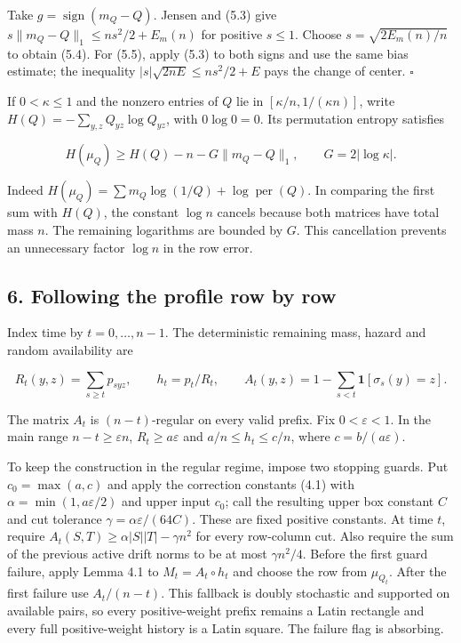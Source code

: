 \documentclass[english,11pt,a4paper]{article}
\begin{document}
Take \(g=\operatorname{sign}(m_Q-Q)\). Jensen and (5.3) give \(s\|m_Q-Q\|_1\le ns^2/2+E_m(n)\) for positive \(s\le1\). Choose \(s=\sqrt{2E_m(n)/n}\) to obtain (5.4). For (5.5), apply (5.3) to both signs and use the same bias estimate; the inequality \(|s|\sqrt{2nE}\le ns^2/2+E\) pays the change of center. \(\square\)

If \(0<\kappa\le1\) and the nonzero entries of \(Q\) lie in \([\kappa/n,1/(\kappa n)]\), write \(H(Q)=-\sum_{y,z}Q_{yz}\log Q_{yz}\), with \(0\log0=0\). Its permutation entropy satisfies

\nopagebreak[4]
\[H(\mu_Q)\ge H(Q)-n-G\|m_Q-Q\|_1,\qquad G=2|\log\kappa|.\tag{5.6}\]

Indeed \(H(\mu_Q)=\sum m_Q\log(1/Q)+\log\operatorname{per}(Q)\). In comparing the first sum with \(H(Q)\), the constant \(\log n\) cancels because both matrices have total mass \(n\). The remaining logarithms are bounded by \(G\). This cancellation prevents an unnecessary factor \(\log n\) in the row error.

\subsection{6. Following the profile row by row}\label{following-the-profile-row-by-row}

Index time by \(t=0,\ldots,n-1\). The deterministic remaining mass, hazard and random availability are

\nopagebreak[4]
\[R_t(y,z)=\sum_{s\ge t}p_{syz},\qquad h_t=p_t/R_t,\qquad
A_t(y,z)=1-\sum_{s<t}\mathbf1[\sigma_s(y)=z].\tag{6.1}\]

The matrix \(A_t\) is \((n-t)\)-regular on every valid prefix. Fix \(0<\varepsilon<1\). In the main range \(n-t\ge\varepsilon n\), \(R_t\ge a\varepsilon\) and \(a/n\le h_t\le c/n\), where \(c=b/(a\varepsilon)\).

To keep the construction in the regular regime, impose two stopping guards. Put \(c_0=\max(a,c)\) and apply the correction constants (4.1) with \(\alpha=\min(1,a\varepsilon/2)\) and upper input \(c_0\); call the resulting upper box constant \(C\) and cut tolerance \(\gamma=\alpha\varepsilon/(64C)\). These are fixed positive constants. At time \(t\), require \(A_t(S,T)\ge\alpha|S||T|-\gamma n^2\) for every row-column cut. Also require the sum of the previous active drift norms to be at most \(\gamma n^2/4\). Before the first guard failure, apply Lemma 4.1 to \(M_t=A_t\circ h_t\) and choose the row from \(\mu_{Q_t}\). After the first failure use \(A_t/(n-t)\). This fallback is doubly stochastic and supported on available pairs, so every positive-weight prefix remains a Latin rectangle and every full positive-weight history is a Latin square. The failure flag is absorbing.
\end{document}

